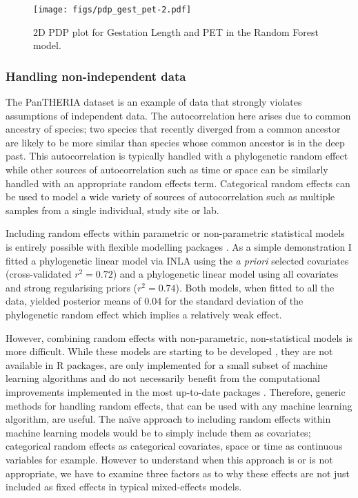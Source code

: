 \documentclass[10pt,]{article}
\begin{document}
\begin{figure}[htbp]
\centering
\texttt{[image: figs/pdp\_gest\_pet-2.pdf]}
\caption{2D PDP plot for Gestation Length and PET in the Random Forest model.\protect\label{fig:2dgestlatrf}}
\end{figure}

\subsubsection{Handling non-independent data}\label{handling-non-independent-data}

The PanTHERIA dataset is an example of data that strongly violates assumptions of independent data. The autocorrelation here arises due to common ancestry of species; two species that recently diverged from a common ancestor are likely to be more similar than species whose common ancestor is in the deep past. This autocorrelation is typically handled with a phylogenetic random effect while other sources of autocorrelation such as time or space can be similarly handled with an appropriate random effects term. Categorical random effects can be used to model a wide variety of sources of autocorrelation such as multiple samples from a single individual, study site or lab.

Including random effects within parametric or non-parametric statistical models is entirely possible with flexible modelling packages \citep{stan, INLA, glmmTMB, tmb}. As a simple demonstration I fitted a phylogenetic linear model via INLA \citep{INLA} using the \emph{a priori} selected covariates (cross-validated \(r^2 = 0.72\)) and a phylogenetic linear model using all covariates and strong regularising priors (\(r^2 = 0.74\)). Both models, when fitted to all the data, yielded posterior means of 0.04 for the standard deviation of the phylogenetic random effect which implies a relatively weak effect.

However, combining random effects with non-parametric, non-statistical models is more difficult. While these models are starting to be developed \citep{ngufor2019mixed, hajjem2014mixed, hajjem2017generalized, eo2014tree, miller2017gradient, REEMtree}, they are not available in R packages, are only implemented for a small subset of machine learning algorithms and do not necessarily benefit from the computational improvements implemented in the most up-to-date packages \citep{wright2015ranger, xgboost}. Therefore, generic methods for handling random effects, that can be used with any machine learning algorithm, are useful. The naïve approach to including random effects within machine learning models would be to simply include them as covariates; categorical random effects as categorical covariates, space or time as continuous variables for example. However to understand when this approach is or is not appropriate, we have to examine three factors as to why these effects are not just included as fixed effects in typical mixed-effects models.
\end{document}
